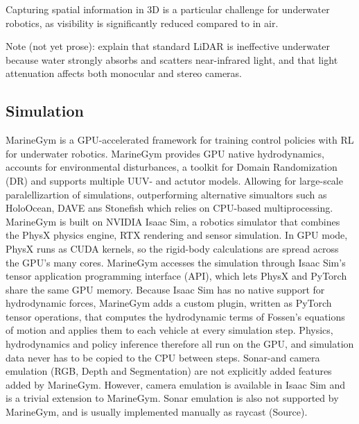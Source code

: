 Capturing spatial information in 3D is a particular challenge for underwater robotics, as visibility is significantly reduced compared to in air.

\begin{todolist}
  \item Note (not yet prose): \textcite[Sec.~2.2.1]{zhu2025machinery} explain that standard LiDAR is ineffective underwater because water strongly absorbs and scatters near-infrared light, and that light attenuation affects both monocular and stereo cameras.
\end{todolist}

\subsection{Simulation}
\label{sec:marinegym}
MarineGym \parencite{chu2025marinegym} is a GPU-accelerated framework for training control policies with RL for underwater robotics. MarineGym provides GPU native hydrodynamics, accounts for environmental disturbances, a toolkit for Domain Randomization (DR) and supports multiple UUV- and actutor models. Allowing for large-scale paralellizartion of simulations, outperforming alternative simualtors such as HoloOcean, DAVE ans Stonefish which relies on CPU-based multiprocessing. MarineGym is built on NVIDIA Isaac Sim, a robotics simulator that combines the PhysX physics engine, RTX rendering and sensor simulation. In GPU mode, PhysX runs as CUDA kernels, so the rigid-body calculations are spread across the GPU's many cores. MarineGym accesses the simulation through Isaac Sim's tensor application programming interface (API), which lets PhysX and PyTorch share the same GPU memory. Because Isaac Sim has no native support for hydrodynamic forces, MarineGym adds a custom plugin, written as PyTorch tensor operations, that computes the hydrodynamic terms of Fossen's equations of motion and applies them to each vehicle at every simulation step. Physics, hydrodynamics and policy inference therefore all run on the GPU, and simulation data never has to be copied to the CPU between steps. Sonar-and camera emulation (RGB, Depth and Segmentation) are not explicitly added features added by MarineGym. However, camera emulation is available in Isaac Sim and is a trivial extension to MarineGym. Sonar emulation is also not supported by MarineGym, and is usually implemented manually as raycast (Source).

